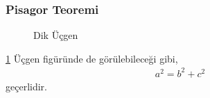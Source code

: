 \subsubsection{Pisagor Teoremi}
\begin{figure}[h!]
    \centering
    \caption{Dik Üçgen}
    \label{fig:pistrig}
\end{figure}

\ref{fig:pistrig} Üçgen figüründe de görülebileceği gibi, 
\begin{equation}
    \begin{aligned}   
        a^2 = b^2 + c^2
    \end{aligned}
\end{equation}
geçerlidir.